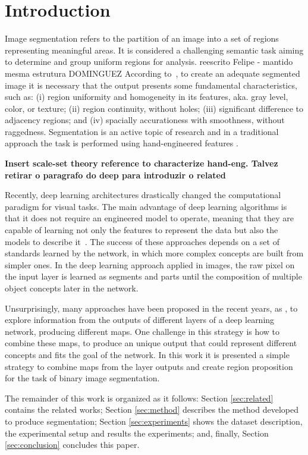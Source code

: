 \section{Introduction}
\label{sec:intro}

Image segmentation refers to the partition of an image into a set of regions representing  meaningful areas. It is considered a challenging semantic task aiming to determine and group uniform regions for analysis. {\color{green}reescrito Felipe - mantido mesma estrutura DOMINGUEZ }According to~\cite{DOMINGUEZ}, to create an adequate segmented image it is necessary that the output presents some fundamental characteristics, such as: (i) region uniformity and homogeneity in  its features, aka. gray level, color, or texture; (ii) region continuity, without holes; (iii) significant difference to adjacency regions; and (iv) spacially accurationess with smoothness, without raggedness. Segmentation is an active topic of research and in a traditional approach the task is performed using hand-engineered features \cite{Segnet:2017:7803544}.  

\textbf{Insert scale-set theory reference to characterize hand-eng. Talvez retirar o paragrafo do deep para introduzir o related}

Recently, deep learning architectures drastically changed the computational paradigm for visual tasks. The main advantage of deep learning algorithms is that it does not require an engineered model to operate, meaning that they are capable of learning not only the features to represent the data but also the models to describe it~\cite{goodfellow16}. The success of these approaches depends on a set of standards learned by the network, in which more complex concepts are built from simpler ones. In the deep learning approach applied in images, the raw pixel on the input layer is learned as segments and parts until the composition of multiple object concepts later in the network.

Unsurprisingly, many approaches have been proposed in the recent years, as \cite{Xie:2017:HED:3158436.3158453} \cite{RCF:8100105} \cite{COB:7917294}, to explore information from the outputs of different layers of a deep learning network, producing different maps. One challenge in this strategy is how to combine these maps, to produce an unique output that could represent different concepts and fits the goal of the network. In this work it is presented a simple strategy to combine maps from the layer outputs and create region proposition for the task of binary image segmentation.   

The remainder of this work is organized as it follows: Section \ref{sec:related} contains the related works; Section \ref{sec:method} describes the method developed to produce segmentation; Section \ref{sec:experiments} shows the dataset description, the experimental setup and results the experiments; and, finally, Section \ref{sec:conclusion} concludes this paper.

